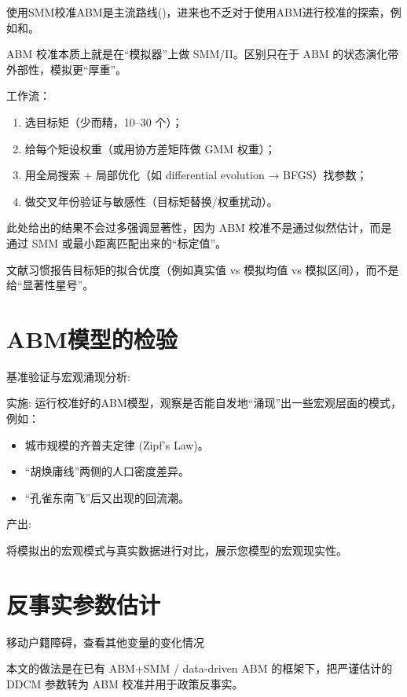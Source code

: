 \documentclass[
  a4paper,
  zihao=-4,
  fontset=mac,
  AutoFakeBold,
  AutoFakeSlant,
  oneside]{ctexbook}
\begin{document}
使用SMM校准ABM是主流路线(\textcite{plattComparisonEconomicAgentbased2020})，进来也不乏对于使用ABM进行校准的探索，例如\textcite{rahmandadUsingMethodSimulated2015}和\textcite{pietzschMetamodelsEvaluatingCalibrating2020}。

ABM 校准本质上就是在“模拟器”上做 SMM/II。区别只在于 ABM 的状态演化带外部性，模拟更“厚重”。

工作流：
\begin{enumerate}
\item 选目标矩（少而精，10–30 个）；
\item 给每个矩设权重（或用协方差矩阵做 GMM 权重）；
\item 用全局搜索 + 局部优化（如 differential evolution → BFGS）找参数；
\item 做交叉年份验证与敏感性（目标矩替换/权重扰动）。
\end{enumerate}


此处给出的结果不会过多强调显著性，因为 ABM 校准不是通过似然估计，而是通过 SMM 或最小距离匹配出来的“标定值”。

文献习惯报告目标矩的拟合优度（例如真实值 vs 模拟均值 vs 模拟区间），而不是给“显著性星号”。



\section{ABM模型的检验} %
\label{sub:abm模型的检验}


基准验证与宏观涌现分析:

实施: 运行校准好的ABM模型，观察是否能自发地“涌现”出一些宏观层面的模式，例如：
\begin{itemize}
  \item 城市规模的齐普夫定律 (Zipf's Law)。
  \item “胡焕庸线”两侧的人口密度差异。
  \item “孔雀东南飞”后又出现的回流潮。
\end{itemize}




产出: 

将模拟出的宏观模式与真实数据进行对比，展示您模型的宏观现实性。




\section{反事实参数估计}
移动户籍障碍，查看其他变量的变化情况


本文的做法是在已有 ABM+SMM / data-driven ABM 的框架下，把严谨估计的 DDCM 参数转为 ABM 校准并用于政策反事实。
\end{document}
